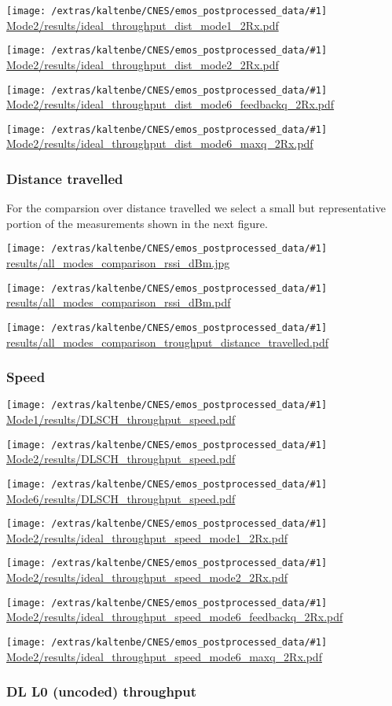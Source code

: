 \documentclass[a4paper,10pt]{article}
\newcommand{\printfile}[1]{
 \begin{minipage}{8cm}
  \centering
  \texttt{[image: /extras/kaltenbe/CNES/emos\_postprocessed\_data/\#1]}
  \url{#1}

 \end{minipage}
}
\begin{document}
\printfile{Mode2/results/ideal_throughput_dist_mode1_2Rx.pdf}
%
\printfile{Mode2/results/ideal_throughput_dist_mode2_2Rx.pdf}

\printfile{Mode2/results/ideal_throughput_dist_mode6_feedbackq_2Rx.pdf}
%
\printfile{Mode2/results/ideal_throughput_dist_mode6_maxq_2Rx.pdf}

\subsubsection{Distance travelled}
For the comparsion over distance travelled we select a small but representative portion of the measurements shown in the next figure.

\printfile{results/all_modes_comparison_rssi_dBm.jpg}
\printfile{results/all_modes_comparison_rssi_dBm.pdf}

\printfile{results/all_modes_comparison_troughput_distance_travelled.pdf}

\subsubsection{Speed}

\printfile{Mode1/results/DLSCH_throughput_speed.pdf}
\printfile{Mode2/results/DLSCH_throughput_speed.pdf}

\printfile{Mode6/results/DLSCH_throughput_speed.pdf}


\printfile{Mode2/results/ideal_throughput_speed_mode1_2Rx.pdf}
%
\printfile{Mode2/results/ideal_throughput_speed_mode2_2Rx.pdf}

\printfile{Mode2/results/ideal_throughput_speed_mode6_feedbackq_2Rx.pdf}
%
\printfile{Mode2/results/ideal_throughput_speed_mode6_maxq_2Rx.pdf}



\subsubsection{DL L0 (uncoded) throughput}
\end{document}
